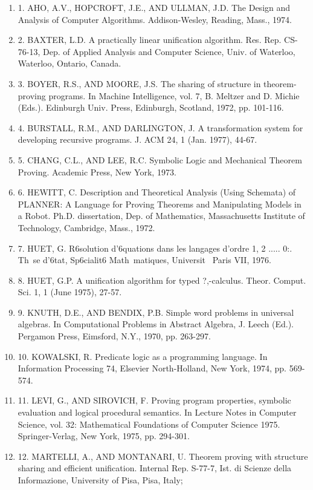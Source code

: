 \begin{enumerate}
  \item
1. AHO, A.V., HOPCROFT, J.E., AND ULLMAN, J.D. The Design and Analysis of Computer Algorithms.
Addison-Wesley, Reading, Mass., 1974.
  \item
2. BAXTER, L.D. A practically linear unification algorithm. Res. Rep. CS-76-13, Dep. of Applied
Analysis and Computer Science, Univ. of Waterloo, Waterloo, Ontario, Canada.
  \item
3. BOYER, R.S., AND MOORE, J.S. The sharing of structure in theorem-proving programs. In
Machine Intelligence, vol. 7, B. Meltzer and D. Michie (Eds.). Edinburgh Univ. Press, Edinburgh,
Scotland, 1972, pp. 101-116.
  \item
4. BURSTALL, R.M., AND DARLINGTON, J. A transformation system for developing recursive programs.
J. ACM 24, 1 (Jan. 1977), 44-67.
  \item
5. CHANG, C.L., AND LEE, R.C. Symbolic Logic and Mechanical Theorem Proving. Academic
Press, New York, 1973.
  \item
6. HEWITT, C. Description and Theoretical Analysis (Using Schemata) of PLANNER: A Language
for Proving Theorems and Manipulating Models in a Robot. Ph.D. dissertation, Dep. of Mathematics,
Massachusetts Institute of Technology, Cambridge, Mass., 1972.
  \item
7. HUET, G. R6solution d'6quations dans les langages d'ordre 1, 2 ..... 0:. Th~se d'6tat, Sp6cialit6
Math~matiques, Universit~ Paris VII, 1976.
  \item
8. HUET, G.P. A unification algorithm for typed ?,-calculus. Theor. Comput. Sci. 1, 1 (June 1975),
27-57.
  \item
9. KNUTH, D.E., AND BENDIX, P.B. Simple word problems in universal algebras. In Computational
Problems in Abstract Algebra, J. Leech (Ed.). Pergamon Press, Eimsford, N.Y., 1970, pp. 263-297.
  \item
10. KOWALSKI, R. Predicate logic as a programming language. In Information Processing 74,
Elsevier North-Holland, New York, 1974, pp. 569-574.
  \item
11. LEVI, G., AND SIROVICH, F. Proving program properties, symbolic evaluation and logical procedural
semantics. In Lecture Notes in Computer Science, vol. 32: Mathematical Foundations of
Computer Science 1975. Springer-Verlag, New York, 1975, pp. 294-301.
  \item
12. MARTELLI, A., AND MONTANARI, U. Theorem proving with structure sharing and efficient
unification. Internal Rep. S-77-7, Ist. di Scienze della Informazione, University of Pisa, Pisa, Italy;

\end{enumerate}
